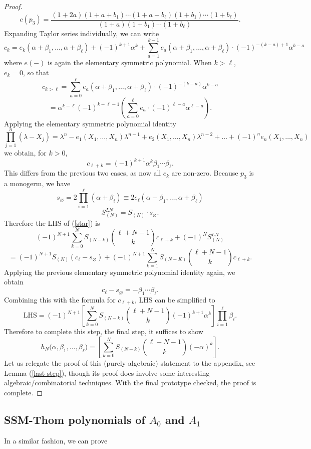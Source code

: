 \documentclass[11pt]{article}
\theoremstyle{plain}
\theoremstyle{definition}
\theoremstyle{definition}
\let\emptyset\varnothing
\begin{document}
\begin{proof}
\[
c(p_3) = \frac{(1+2a)(1+a+b_1)\cdots (1+a+b_\ell)(1+b_1)\cdots(1+b_\ell)}{(1+a)(1+b_1)\cdots (1+b_\ell)}.
\]
Expanding Taylor series individually, we can write 
\[
c_k=e_k(\alpha+\beta_1,\dots,\alpha+\beta_\ell) + (-1)^{k+1}\alpha^k+\sum_{a=1}^{k-1 } e_a(\alpha+\beta_1,\dots,\alpha+\beta_\ell)\cdot (-1)^{-(k-a)+1}\alpha^{k-a} 
\]
where $e(-)$ is again the elementary symmetric polynomial. When $k>\ell$, $e_k=0$, so that
\[
c_{k>\ell} = \sum_{a=0}^\ell e_a(\alpha+\beta_1,\dots,\alpha+\beta_\ell)\cdot(-1)^{-(k-a)}\alpha^{k-a}
\]
\[
=\alpha^{k-\ell}(-1)^{k-\ell-1}\left(\sum_{a=0}^\ell e_a\cdot (-1)^{\ell-a}\alpha^{\ell-a}\right).
\]
Applying the elementary symmetric polynomial identity
\[
\prod_{j=1}^n(\lambda-X_j) = \lambda^n-e_1(X_1,\dots,X_n)\lambda^{n-1} + e_2(X_1,\dots,X_n)\lambda^{n-2}+\dots+(-1)^ne_n(X_1,\dots,X_n)
\]
we obtain, for $k>0$, 
\[
c_{\ell+k} = (-1)^{k+1}\alpha^k\beta_1\cdots \beta_\ell.
\]
This differs from the previous two cases, as now all $c_k$ are non-zero. Because $p_3$ is a monogerm, we have 
\[
s_\emptyset = 2\prod_{i=1}^\ell(\alpha+\beta_i) \equiv 2e_\ell(\alpha+\beta_1,\dots,\alpha+\beta_\ell)
\]
\[
S_{(N)}^{LN} = S_{(N)}\cdot s_\emptyset.
\]
Therefore the LHS of (\ref{star}) is 
\[
(-1)^{N+1}\sum_{k=0}^N S_{(N-k)}{\ell+N-1\choose k}c_{\ell+k} + (-1)^NS^{LN}_{(N)}
\]
\[
=(-1)^{N+1}S_{(N)}(c_\ell-s_\emptyset) + (-1)^{N+1}\sum_{k=1}^N S_{(N-K)}{\ell+N-1\choose k}c_{\ell+k}.
\]
Applying the previous elementary symmetric polynomial identity again, we obtain 
\[
c_\ell-s_\emptyset = -\beta_1\cdots \beta_\ell.
\]
Combining this with the formula for $c_{\ell+k}$, LHS can be simplified to 
\[
\text{LHS} = (-1)^{N+1}\left[\sum_{k=0}^NS_{(N-k)}{\ell+N-1\choose k}(-1)^{k+1}\alpha^k\right]\prod_{i=1}^{\ell}\beta_i.
\]
Therefore to complete this step, the final step, it suffices to show 
\[
h_N\big(\alpha,\beta_1,\dots,\beta_\ell\big) = \left[\sum_{k=0}^NS_{(N-k)}{\ell+N-1\choose k}(-\alpha)^k\right].
\]
Let us relegate the proof of this (purely algebraic) statement to the appendix, see Lemma (\ref{last-step}), though its proof does involve some interesting algebraic/combinatorial techniques. With the final prototype checked, the proof is complete. 
\end{proof}

\subsection{SSM-Thom polynomials of $A_0$ and $A_1$}\label{A0, A1 subsection}

In a similar fashion, we can prove
\end{document}
